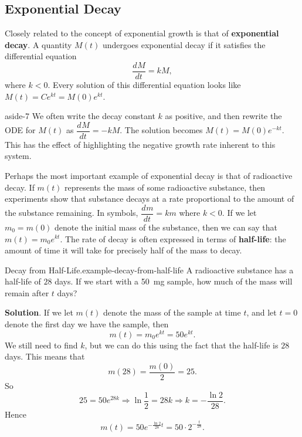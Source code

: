 \documentclass[10pt,]{book}
\newcommand{\terminology}[1]{\textbf{#1}}
\numberwithin{equation}{section}
\newcommand{\dv}[3][]{\dfrac{d^{#1} #2}{d #3^{#1}}}
\begin{document}
\subsection[{Exponential Decay}]{Exponential Decay}\label{subsection-exponential-decay}
\hypertarget{p-252}{}%
Closely related to the concept of exponential growth is that of \terminology{exponential decay}. A quantity \(M(t)\) undergoes exponential decay if it satisfies the differential equation%
\begin{equation*}
\dv{M}{t} = kM,
\end{equation*}
where \(k < 0\). Every solution of this differential equation looks like \(M(t) = Ce^{kt} = M(0)e^{kt}\).%
\begin{aside}{}{aside-7}%
\hypertarget{p-253}{}%
We often write the decay constant \(k\) as positive, and then rewrite the ODE for \(M(t)\) as \(\dv{M}{t} = -kM\). The solution becomes \(M(t) = M(0)e^{-kt}\). This has the effect of highlighting the negative growth rate inherent to this system.%
\end{aside}
\hypertarget{p-254}{}%
Perhaps the most important example of exponential decay is that of radioactive decay. If \(m(t)\) represents the mass of some radioactive substance, then experiments show that substance decays at a rate proportional to the amount of the substance remaining. In symbols, \(\dv{m}{t} = km\) where \(k < 0\). If we let \(m_{0} = m(0)\) denote the initial mass of the substance, then we can say that \(m(t) = m_{0}e^{kt}\). The rate of decay is often expressed in terms of \terminology{half-life}: the amount of time it will take for precisely half of the mass to decay.%
\begin{example}{Decay from Half-Life.}{example-decay-from-half-life}%
\hypertarget{p-255}{}%
A radioactive substance has a half-life of \(28\) days. If we start with a \SI{50}{\milli\gram} sample, how much of the mass will remain after \(t\) days?%
\par\smallskip%
\noindent\textbf{Solution}.\hypertarget{solution-55}{}\quad%
\hypertarget{p-256}{}%
If we let \(m(t)\) denote the mass of the sample at time \(t\), and let \(t=0\) denote the first day we have the sample, then%
\begin{equation*}
m(t) = m_{0}e^{kt} = 50e^{kt}.
\end{equation*}
We still need to find \(k\), but we can do this using the fact that the half-life is \(28\) days. This means that%
\begin{equation*}
m(28) = \frac{m(0)}{2} = 25.
\end{equation*}
So%
\begin{equation*}
25 = 50e^{28k}\Rightarrow \ln\frac{1}{2} = 28k\Rightarrow k = -\frac{\ln2}{28}.
\end{equation*}
Hence%
\begin{equation*}
m(t) = 50e^{-\frac{\ln2}{28}t} = 50\cdot2^{-\frac{t}{28}}.
\end{equation*}
%
\end{example}
%
%
\typeout{************************************************}
\typeout{************************************************}
%
\end{document}

